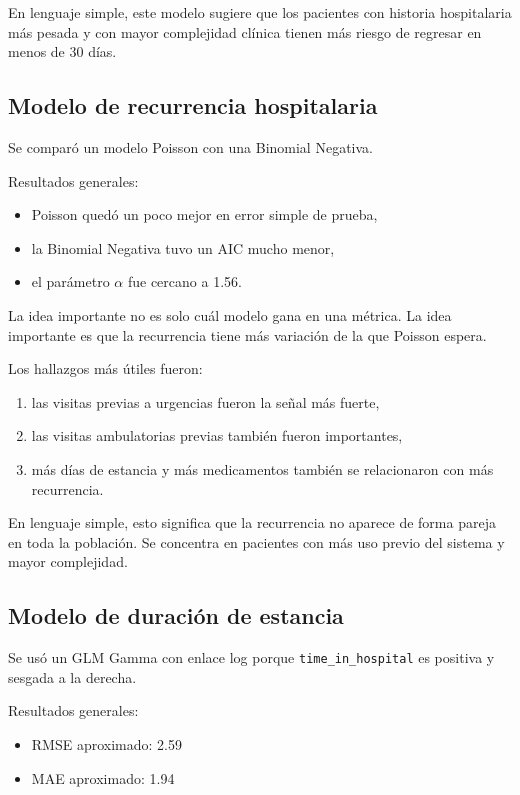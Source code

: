 \documentclass[12pt]{article}
\begin{document}
En lenguaje simple, este modelo sugiere que los pacientes con historia hospitalaria más pesada y con mayor complejidad clínica tienen más riesgo de regresar en menos de 30 días.

\subsection{Modelo de recurrencia hospitalaria}

Se comparó un modelo Poisson con una Binomial Negativa.

Resultados generales:
\begin{itemize}[leftmargin=1.6em]
    \item Poisson quedó un poco mejor en error simple de prueba,
    \item la Binomial Negativa tuvo un AIC mucho menor,
    \item el parámetro \(\alpha\) fue cercano a 1.56.
\end{itemize}

La idea importante no es solo cuál modelo gana en una métrica. La idea importante es que la recurrencia tiene más variación de la que Poisson espera.

Los hallazgos más útiles fueron:
\begin{enumerate}[leftmargin=1.6em]
    \item las visitas previas a urgencias fueron la señal más fuerte,
    \item las visitas ambulatorias previas también fueron importantes,
    \item más días de estancia y más medicamentos también se relacionaron con más recurrencia.
\end{enumerate}

En lenguaje simple, esto significa que la recurrencia no aparece de forma pareja en toda la población. Se concentra en pacientes con más uso previo del sistema y mayor complejidad.

\subsection{Modelo de duración de estancia}

Se usó un GLM Gamma con enlace log porque \texttt{time\_in\_hospital} es positiva y sesgada a la derecha.

Resultados generales:
\begin{itemize}[leftmargin=1.6em]
    \item RMSE aproximado: 2.59
    \item MAE aproximado: 1.94
\end{itemize}
\end{document}
